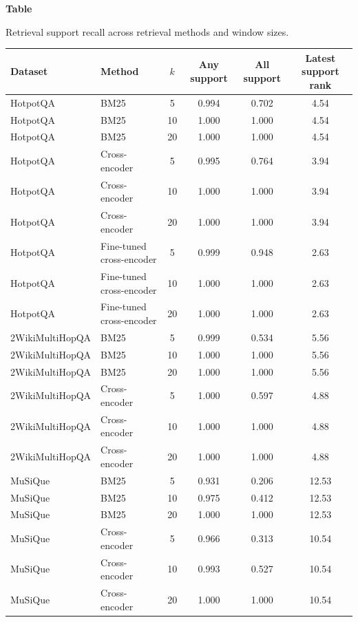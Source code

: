 \documentclass[a4paper,fleqn]{cas-sc}
\newcommand{\sidetablecaption}[2]{%
  \refstepcounter{table}\label{#1}%
  \begingroup
  \raggedright\footnotesize
  \textbf{Table~\thetable}\par
  #2\par
  \endgroup
  \vspace{3pt}
}
\begin{document}
{\renewcommand{\arraystretch}{0.82}
\begin{center}
\centering
\sidetablecaption{tab:appendix-support-recall}{Retrieval support recall across
retrieval methods and window sizes.}
\scriptsize
\setlength{\tabcolsep}{2.7pt}
\begin{tabular}{llcccc}
\toprule
Dataset & Method & $k$ & Any support & All support & Latest support rank \\
\midrule
HotpotQA & BM25 & 5 & 0.994 & 0.702 & 4.54 \\
HotpotQA & BM25 & 10 & 1.000 & 1.000 & 4.54 \\
HotpotQA & BM25 & 20 & 1.000 & 1.000 & 4.54 \\
HotpotQA & Cross-encoder & 5 & 0.995 & 0.764 & 3.94 \\
HotpotQA & Cross-encoder & 10 & 1.000 & 1.000 & 3.94 \\
HotpotQA & Cross-encoder & 20 & 1.000 & 1.000 & 3.94 \\
HotpotQA & Fine-tuned cross-encoder & 5 & 0.999 & 0.948 & 2.63 \\
HotpotQA & Fine-tuned cross-encoder & 10 & 1.000 & 1.000 & 2.63 \\
HotpotQA & Fine-tuned cross-encoder & 20 & 1.000 & 1.000 & 2.63 \\
2WikiMultiHopQA & BM25 & 5 & 0.999 & 0.534 & 5.56 \\
2WikiMultiHopQA & BM25 & 10 & 1.000 & 1.000 & 5.56 \\
2WikiMultiHopQA & BM25 & 20 & 1.000 & 1.000 & 5.56 \\
2WikiMultiHopQA & Cross-encoder & 5 & 1.000 & 0.597 & 4.88 \\
2WikiMultiHopQA & Cross-encoder & 10 & 1.000 & 1.000 & 4.88 \\
2WikiMultiHopQA & Cross-encoder & 20 & 1.000 & 1.000 & 4.88 \\
MuSiQue & BM25 & 5 & 0.931 & 0.206 & 12.53 \\
MuSiQue & BM25 & 10 & 0.975 & 0.412 & 12.53 \\
MuSiQue & BM25 & 20 & 1.000 & 1.000 & 12.53 \\
MuSiQue & Cross-encoder & 5 & 0.966 & 0.313 & 10.54 \\
MuSiQue & Cross-encoder & 10 & 0.993 & 0.527 & 10.54 \\
MuSiQue & Cross-encoder & 20 & 1.000 & 1.000 & 10.54 \\
\bottomrule
\end{tabular}
\end{center}
}
\FloatBarrier
\end{document}
